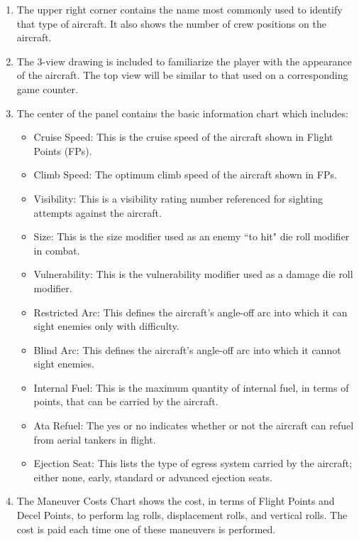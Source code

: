 \begin{enumerate}

    \item {} The upper right corner contains the name most commonly used to identify that type of aircraft. It also shows the number of crew positions on the aircraft.

    \item {} The 3-view drawing is included to familiarize the player with the appearance of the aircraft. The top view will be similar to that used on a corresponding game counter.

    \item {} The center of the panel contains the basic information chart which includes:
    \begin{itemize}
        \item Cruise Speed: This is the cruise speed of the aircraft shown in Flight Points (FPs).
        \item Climb Speed: The optimum climb speed of the aircraft shown in FPs.
        \item Visibility: This is a visibility rating number referenced for sighting attempts against the aircraft.
        \item Size: This is the size modifier used as an enemy “to hit" die roll modifier in combat.
        \item Vulnerability: This is the vulnerability modifier used as a damage die roll modifier.
        \item Restricted Arc: This defines the aircraft's angle-off arc into which it can sight enemies only with difficulty.
        \item Blind Arc: This defines the aircraft's angle-off arc into which it cannot sight enemies.
        \item Internal Fuel: This is the maximum quantity of internal fuel, in terms of points, that can be carried by the aircraft.
        \item Ata Refuel: The yes or no indicates whether or not the aircraft can refuel from aerial tankers in flight.
        \item Ejection Seat: This lists the type of egress system carried by the aircraft; either none, early, standard or advanced ejection seats.
    \end{itemize}

    \item {} The Maneuver Costs Chart shows the cost, in terms of Flight Points and Decel Points, to perform lag rolls, displacement rolls, and vertical rolls. The cost is paid each time one of these maneuvers is performed.


\end{enumerate}
